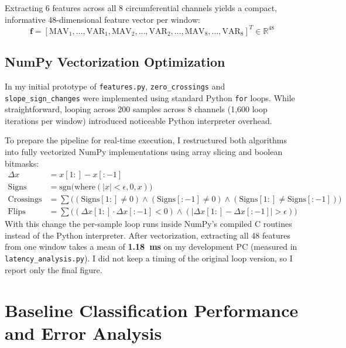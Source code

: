 \documentclass[11pt,a4paper]{article}
\begin{document}
Extracting 6 features across all 8 circumferential channels yields a compact, informative 48-dimensional feature vector per window:
\begin{equation}
    \mathbf{f} = [\text{MAV}_1, \dots, \text{VAR}_1, \text{MAV}_2, \dots, \text{VAR}_2, \dots, \text{MAV}_8, \dots, \text{VAR}_8]^T \in \mathbb{R}^{48}
\end{equation}

\subsection{NumPy Vectorization Optimization}
In my initial prototype of \texttt{features.py}, \texttt{zero\_crossings} and \texttt{slope\_sign\_changes} were implemented using standard Python \texttt{for} loops. While straightforward, looping across 200 samples across 8 channels (1,600 loop iterations per window) introduced noticeable Python interpreter overhead.

To prepare the pipeline for real-time execution, I restructured both algorithms into fully vectorized NumPy implementations using array slicing and boolean bitmasks:
\begin{align}
    \Delta x &= x[1:] - x[:-1] \\
    \text{Signs} &= \text{sgn}\Big(\text{where}(|x| < \epsilon, 0, x)\Big) \\
    \text{Crossings} &= \sum \Big( (\text{Signs}[1:] \neq 0) \land (\text{Signs}[:-1] \neq 0) \land (\text{Signs}[1:] \neq \text{Signs}[:-1]) \Big) \\
    \text{Flips} &= \sum \Big( (\Delta x[1:] \cdot \Delta x[:-1] < 0) \land (|\Delta x[1:] - \Delta x[:-1]| > \epsilon) \Big)
\end{align}
With this change the per-sample loop runs inside NumPy's compiled C routines instead of the Python interpreter. After vectorization, extracting all 48 features from one window takes a mean of \textbf{1.18~ms} on my development PC (measured in \texttt{latency\_analysis.py}). I did not keep a timing of the original loop version, so I report only the final figure.

\section{Baseline Classification Performance and Error Analysis}
\end{document}
